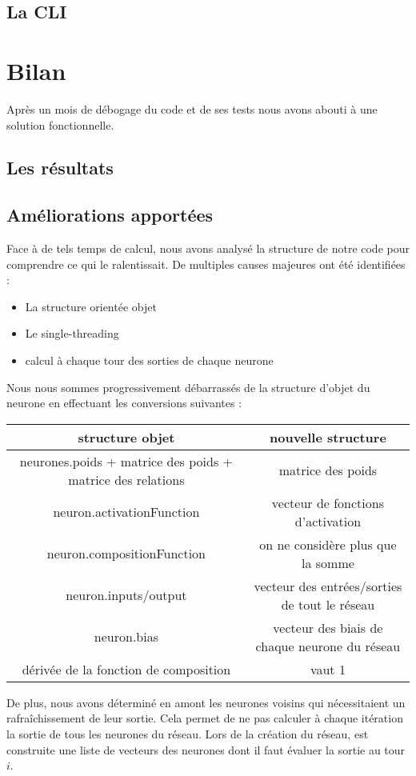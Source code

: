 \subsection{La CLI}

\section{Bilan}

Après un mois de débogage du code et de ses tests nous avons abouti à une
solution fonctionnelle.

\subsection{Les résultats}

\subsection{Améliorations apportées}

Face à de tels temps de calcul, nous avons analysé la structure de notre code
pour comprendre ce qui le ralentissait. De multiples causes majeures ont été
identifiées :
\begin{itemize}
\item La structure orientée objet
\item Le single-threading
\item calcul à chaque tour des sorties de chaque neurone
\end{itemize}

\medskip

Nous nous sommes progressivement débarrassés de la structure d'objet du neurone
en effectuant les conversions suivantes :

\medskip

\begin{tabular}{c|c}
   structure objet & nouvelle structure \\
   \hline
   neurones.poids + matrice des poids + matrice des relations & matrice des poids \\
   neuron.activationFunction & vecteur de fonctions d'activation \\
   neuron.compositionFunction & on ne considère plus que la somme \\
   neuron.inputs/output & vecteur des entrées/sorties de tout le réseau \\
   neuron.bias & vecteur des biais de chaque neurone du réseau \\
   dérivée de la fonction de composition & vaut 1
\end{tabular}

\medskip

De plus, nous avons déterminé en amont les neurones voisins qui nécessitaient
un rafraîchissement de leur sortie. Cela permet de ne pas calculer à chaque
itération la sortie de tous les neurones du réseau. Lors de la création du
réseau, est construite une liste de vecteurs des neurones dont il faut évaluer
la sortie au tour $i$.
